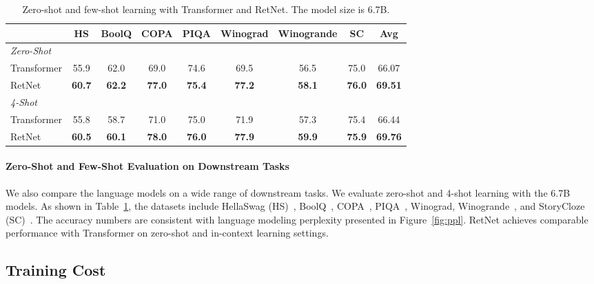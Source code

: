 \documentclass{article}
\newcommand\our{RetNet}
\begin{document}
\begin{table}
\centering
\begin{tabular}{@{}lcccccccc@{}}
\toprule
& \textbf{HS} & \textbf{BoolQ} & \textbf{COPA} & \textbf{PIQA} & \textbf{Winograd} & \textbf{Winogrande} & \textbf{SC} & \bf Avg \\
\midrule
\multicolumn{8}{l}{\textit{Zero-Shot}} & \\
Transformer & 55.9 & 62.0 & 69.0 & 74.6 & 69.5 & 56.5 & 75.0 & 66.07\\
\our{} & \textbf{60.7} & \textbf{62.2} & \textbf{77.0} & \textbf{75.4} & \textbf{77.2} & \textbf{58.1} & \textbf{76.0} & \bf 69.51 \\
\midrule
\multicolumn{8}{l}{\textit{4-Shot}} & \\
Transformer & 55.8 & 58.7 & 71.0 & 75.0 & 71.9 & 57.3 & 75.4 & 66.44\\
\our{} & \textbf{60.5} & \textbf{60.1} & \textbf{78.0} & \textbf{76.0} & \textbf{77.9} & \textbf{59.9} & \textbf{75.9} & \bf 69.76 \\
\bottomrule
\end{tabular}
\caption{Zero-shot and few-shot learning with Transformer and \our{}. The model size is 6.7B.}
\label{tbl:endtask}
\end{table}


\paragraph{Zero-Shot and Few-Shot Evaluation on Downstream Tasks}
We also compare the language models on a wide range of downstream tasks.
We evaluate zero-shot and 4-shot learning with the 6.7B models.
As shown in Table~\ref{tbl:endtask}, the datasets include HellaSwag (HS)~\cite{hellaswag}, BoolQ~\cite{boolq}, COPA~\cite{superglue}, PIQA~\cite{piqa}, Winograd, Winogrande~\cite{winograd2012}, and StoryCloze (SC)~\cite{storycloze}.
The accuracy numbers are consistent with language modeling perplexity presented in Figure~\ref{fig:ppl}.
\our{} achieves comparable performance with Transformer on zero-shot and in-context learning settings.


\subsection{Training Cost}
\label{sec:training:cost}
\end{document}
